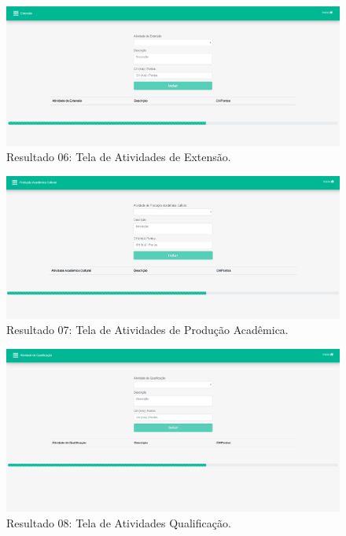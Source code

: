 \begin{figure}[htb]
    \centering
    \includegraphics[width=.8\textwidth]{img/pagina_extensao.PNG}
    \caption[Resultado 06: Tela de Atividades de Extensão]{Resultado 06: Tela de Atividades de Extensão.}
    \label{fig:result06}
\end{figure}

\begin{figure}[htb]
    \centering
    \includegraphics[width=.8\textwidth]{img/pagina_producao.PNG}
    \caption[Resultado 07: Tela de Atividades de Produção Acadêmica]{Resultado 07: Tela de Atividades de Produção Acadêmica.}
    \label{fig:result07}
\end{figure}

\begin{figure}[htb]
    \centering
    \includegraphics[width=.8\textwidth]{img/pagina_at_qualificacao.PNG}
    \caption[Resultado 08: Tela de Atividades Qualificação]{Resultado 08: Tela de Atividades Qualificação.}
    \label{fig:result08}
\end{figure}

